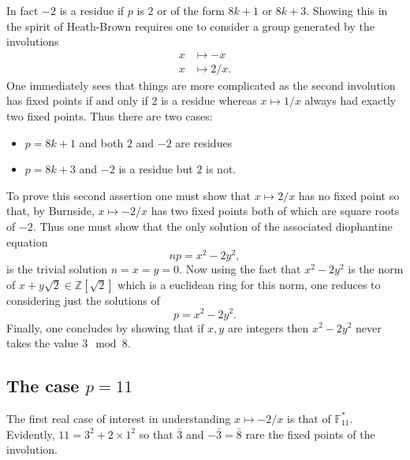 \documentclass[12pt,a4paper]{amsart}
\begin{document}
In fact  $-2$  is a residue if $p$ is $2$ or of the form $8k+1$ or $8k+3$.
Showing this in the spirit of Heath-Brown requires one to consider a group generated by the involutions 
\begin{eqnarray*}
x & \mapsto -x \\
x & \mapsto 2/x.
\end{eqnarray*}
One immediately sees that things are more complicated as the
second involution has fixed points if and only if $2$ is a residue
whereas $x\mapsto 1/x$ always had exactly two fixed points.
Thus there are two cases:
\begin{itemize}
	\item $p=8k+1$ and both $2$ and $-2$ are residues
	\item $p=8k+3$ and $-2$ is a residue but $2$ is not.
\end{itemize}
To prove this second assertion 
one must show that 
$x  \mapsto 2/x$ has no fixed point
so that, by Burnside,
$x  \mapsto -2/x$ has two fixed points 
both of which are square roots of $-2$.
Thus one must show that the only solution of the associated diophantine equation 
$$np = x^2 - 2y^2,$$
is the trivial solution $n=x=y=0$.
Now using the fact that 
$x^2 - 2y^2$ 
is the norm of $x+y \sqrt{2}\in \mathbb{Z}[\sqrt{2}]$ which is a
euclidean ring for this norm,
one reduces to considering just the solutions of 
$$p = x^2 - 2y^2.$$
Finally, one concludes by showing that if $x,y$ are integers then
$x^2 - 2y^2$ never takes the value $3 \mod 8$.

\subsection{The case $p=11$}

The first real case of interest in understanding 
$x\mapsto -2/x$ is that of $\mathbb{F}_{11}^*$.
Evidently, $11 = 3^2 + 2\times 1^2$ so that 
$\bar{3}$ and $-\bar{3} = \bar{8}$ rare the fixed points of the involution.
\end{document}
